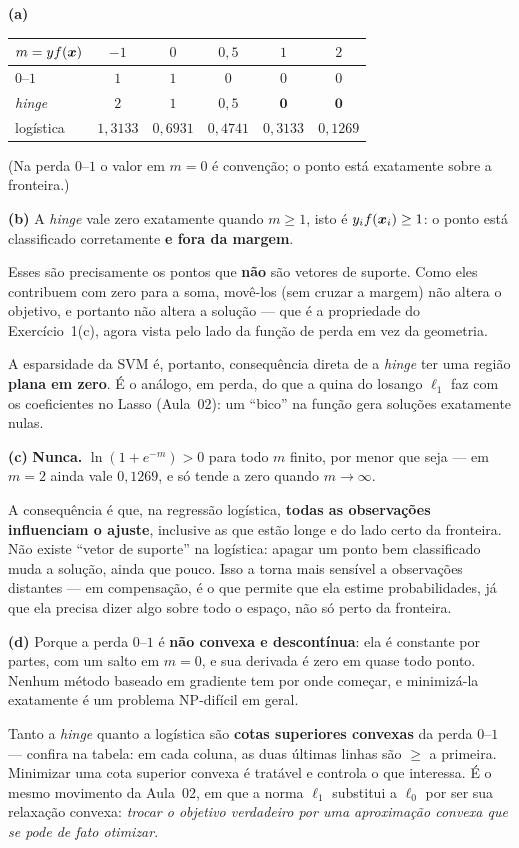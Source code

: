 \documentclass[11pt,a4paper]{article}
\begin{document}
\begin{solucao}
\textbf{(a)}
\begin{center}\small
\renewcommand{\arraystretch}{1.3}
\begin{tabular}{@{}lccccc@{}}
\toprule
$m=yf(\bm{x})$ & $-1$ & $0$ & $0{,}5$ & $1$ & $2$ \\
\midrule
$0$--$1$    & $1$ & $1$ & $0$ & $0$ & $0$ \\
\emph{hinge}& $2$ & $1$ & $0{,}5$ & $\mathbf{0}$ & $\mathbf{0}$ \\
logística   & $1{,}3133$ & $0{,}6931$ & $0{,}4741$ & $0{,}3133$ & $0{,}1269$ \\
\bottomrule
\end{tabular}
\end{center}
(Na perda $0$--$1$ o valor em $m=0$ é convenção; o ponto está exatamente sobre a
fronteira.)

\smallskip
\textbf{(b)} A \emph{hinge} vale zero exatamente quando $m\ge 1$, isto é
$y_i f(\bm{x}_i)\ge 1$: o ponto está classificado corretamente \textbf{e fora da
margem}.

Esses são precisamente os pontos que \textbf{não} são vetores de suporte. Como
eles contribuem com zero para a soma, movê-los (sem cruzar a margem) não altera
o objetivo, e portanto não altera a solução --- que é a propriedade do
Exercício~1(c), agora vista pelo lado da função de perda em vez da geometria.

A esparsidade da SVM é, portanto, consequência direta de a \emph{hinge} ter uma
região \textbf{plana em zero}. É o análogo, em perda, do que a quina do losango
$\ell_1$ faz com os coeficientes no Lasso (Aula~02): um ``bico'' na função gera
soluções exatamente nulas.

\smallskip
\textbf{(c)} \textbf{Nunca.} $\ln(1+e^{-m})>0$ para todo $m$ finito, por menor
que seja --- em $m=2$ ainda vale $0{,}1269$, e só tende a zero quando
$m\to\infty$.

A consequência é que, na regressão logística, \textbf{todas as observações
influenciam o ajuste}, inclusive as que estão longe e do lado certo da fronteira.
Não existe ``vetor de suporte'' na logística: apagar um ponto bem classificado
muda a solução, ainda que pouco. Isso a torna mais sensível a observações
distantes --- em compensação, é o que permite que ela estime probabilidades, já
que ela precisa dizer algo sobre todo o espaço, não só perto da fronteira.

\smallskip
\textbf{(d)} Porque a perda $0$--$1$ é \textbf{não convexa e descontínua}: ela é
constante por partes, com um salto em $m=0$, e sua derivada é zero em quase todo
ponto. Nenhum método baseado em gradiente tem por onde começar, e minimizá-la
exatamente é um problema NP-difícil em geral.

Tanto a \emph{hinge} quanto a logística são \textbf{cotas superiores convexas} da
perda $0$--$1$ --- confira na tabela: em cada coluna, as duas últimas linhas são
$\ge$ a primeira. Minimizar uma cota superior convexa é tratável e controla o que
interessa. É o mesmo movimento da Aula~02, em que a norma $\ell_1$ substitui a
$\ell_0$ por ser sua relaxação convexa: \emph{trocar o objetivo verdadeiro por
uma aproximação convexa que se pode de fato otimizar}.
\end{solucao}
\end{document}
